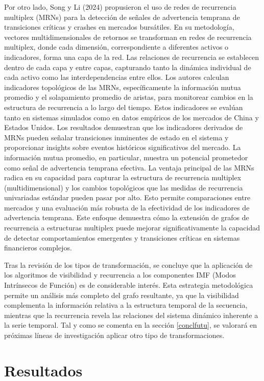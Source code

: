\documentclass[11pt,a4paper]{article}
\begin{document}
Por otro lado, Song y Li (2024) \cite{song2024early} propusieron el uso de redes de recurrencia multiplex (MRNs) para la detección de señales de advertencia temprana de transiciones críticas y crashes en mercados bursátiles. En su metodología, vectores multidimensionales de retornos se transforman en redes de recurrencia multiplex, donde cada dimensión, correspondiente a diferentes activos o indicadores, forma una capa de la red. Las relaciones de recurrencia se establecen dentro de cada capa y entre capas, capturando tanto la dinámica individual de cada activo como las interdependencias entre ellos. Los autores calculan indicadores topológicos de las MRNs, específicamente la información mutua promedio y el solapamiento promedio de aristas, para monitorear cambios en la estructura de recurrencia a lo largo del tiempo. Estos indicadores se evalúan tanto en sistemas simulados como en datos empíricos de los mercados de China y Estados Unidos. Los resultados demuestran que los indicadores derivados de MRNs pueden señalar transiciones inminentes de estado en el sistema y proporcionar insights sobre eventos históricos significativos del mercado. La información mutua promedio, en particular, muestra un potencial prometedor como señal de advertencia temprana efectiva. La ventaja principal de las MRNs radica en su capacidad para capturar la estructura de recurrencia multiplex (multidimensional) y los cambios topológicos que las medidas de recurrencia univariadas estándar pueden pasar por alto. Esto permite comparaciones entre mercados y una evaluación más robusta de la efectividad de los indicadores de advertencia temprana. Este enfoque demuestra cómo la extensión de grafos de recurrencia a estructuras multiplex puede mejorar significativamente la capacidad de detectar comportamientos emergentes y transiciones críticas en sistemas financieros complejos.

Tras la revisión de los tipos de transformación, se concluye que la aplicación de los algoritmos de visibilidad y recurrencia a los componentes IMF (Modos Intrínsecos de Función) es de considerable interés. Esta estrategia metodológica permite un análisis más completo del grafo resultante, ya que la visibilidad complementa la información relativa a la estructura temporal de la secuencia, mientras que la recurrencia revela las relaciones del sistema dinámico inherente a la serie temporal. Tal y como se comenta en la sección \ref{conclfutu}, se valorará en próximas líneas de investigación aplicar otro tipo de transformaciones.

\section{Resultados}
\label{sec:results}
\end{document}
